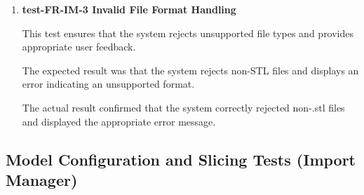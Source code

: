 \documentclass[12pt, titlepage]{article}
\begin{document}
\begin{enumerate}
The actual result confirmed that the system successfully loaded the project and voxel data, and that partitions and voxelized coordinates were retrieved as expected.

\item \textbf{test-FR-IM-3 Invalid File Format Handling}

\hspace{1.5em} This test ensures that the system rejects unsupported file types and provides appropriate user feedback.

The expected result was that the system rejects non-STL files and displays an error indicating an unsupported format.

The actual result confirmed that the system correctly rejected non-.stl files and displayed the appropriate error message.

\end{enumerate}

\subsection{Model Configuration and Slicing Tests (Import Manager)}
\end{document}
